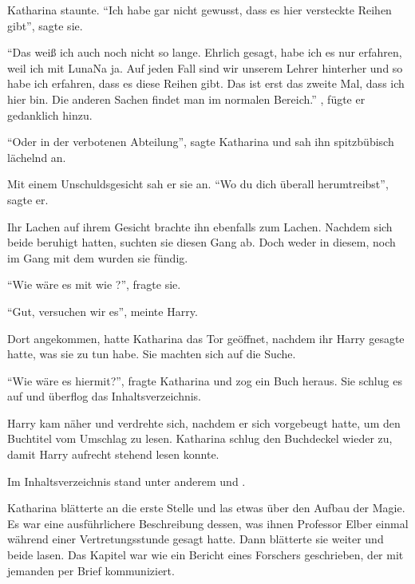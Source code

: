 Katharina staunte. \enquote{Ich habe gar nicht gewusst, dass es hier versteckte Reihen gibt}, sagte sie.

\enquote{Das weiß ich auch noch nicht so lange. Ehrlich gesagt, habe ich es nur erfahren, weil ich mit Luna\abs Na ja. Auf jeden Fall sind wir unserem Lehrer hinterher und so habe ich erfahren, dass es diese Reihen gibt. Das ist erst das zweite Mal, dass ich hier bin. Die anderen Sachen findet man im normalen Bereich.} , fügte er gedanklich hinzu.

\enquote{Oder in der verbotenen Abteilung}, sagte Katharina und sah ihn spitzbübisch lächelnd an.

Mit einem Unschuldsgesicht sah er sie an. \enquote{Wo du dich überall herumtreibst}, sagte er.

Ihr Lachen auf ihrem Gesicht brachte ihn ebenfalls zum Lachen. Nachdem sich beide beruhigt hatten, suchten sie diesen Gang ab. Doch weder in diesem, noch im Gang mit dem  wurden sie fündig.

\enquote{Wie wäre es mit  wie ?}, fragte sie.

\enquote{Gut, versuchen wir es}, meinte Harry.

Dort angekommen, hatte Katharina das Tor geöffnet, nachdem ihr Harry gesagte hatte, was sie zu tun habe. Sie machten sich auf die Suche.

\enquote{Wie wäre es hiermit?}, fragte Katharina und zog ein Buch heraus. Sie schlug es auf und überflog das Inhaltsverzeichnis.

Harry kam näher und verdrehte sich, nachdem er sich vorgebeugt hatte, um den Buchtitel vom Umschlag zu lesen. Katharina schlug den Buchdeckel wieder zu, damit Harry aufrecht stehend lesen konnte. 

Im Inhaltsverzeichnis stand unter anderem  und .

Katharina blätterte an die erste Stelle und las etwas über den Aufbau der Magie. Es war eine ausführlichere Beschreibung dessen, was ihnen Professor Elber einmal während einer Vertretungsstunde gesagt hatte. Dann blätterte sie weiter und beide lasen. Das Kapitel war wie ein Bericht eines Forschers geschrieben, der mit jemanden per Brief kommuniziert.

